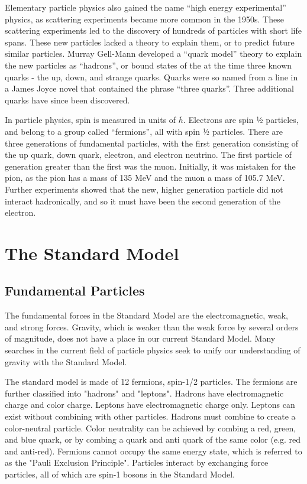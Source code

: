 Elementary particle physics also gained the name “high energy experimental” physics, as scattering experiments became more common in the 1950s. These scattering experiments led to the discovery of hundreds of particles with short life spans. These new particles lacked a theory to explain them, or to predict future similar particles. Murray Gell-Mann developed a “quark model” theory to explain the new particles as “hadrons”, or bound states of the at the time three known quarks - the up, down, and strange quarks. Quarks were so named from a line in a James Joyce novel that contained the phrase “three quarks”. Three additional quarks have since been discovered.

In particle physics, spin is measured in units of $\bar{h}$. Electrons are spin ½ particles, and belong to a group called “fermions”, all with spin ½ particles. There are three generations of fundamental particles, with the first generation consisting of the up quark, down quark, electron, and electron neutrino. The first particle of generation greater than the first was the muon. Initially, it was mistaken for the pion, as the pion has a mass of 135 MeV and the muon a mass of 105.7 MeV. Further experiments showed that the new, higher generation particle did not interact hadronically, and so it must have been the second generation of the electron.


\section{The Standard Model}



\subsection{Fundamental Particles}

The fundamental forces in the Standard Model are the electromagnetic, weak, and strong forces. Gravity, which is weaker than the weak force by several orders of magnitude, does not have a place in our current Standard Model. Many searches in the current field of particle physics seek to unify our understanding of gravity with the Standard Model. 


The standard model is made of 12 fermions, spin-1/2 particles. The fermions are further classified into "hadrons" and "leptons". Hadrons have electromagnetic charge and color charge. Leptons have electromagnetic charge only. Leptons can exist without combining with other particles. Hadrons must combine to create a color-neutral particle. Color neutrality can be achieved by combing a red, green, and blue quark, or by combing a quark and anti quark of the same color (e.g. red and anti-red). Fermions cannot occupy the same energy state, which is referred to as the "Pauli Exclusion Principle". Particles interact by exchanging force particles, all of which are spin-1 bosons in the Standard Model. 


